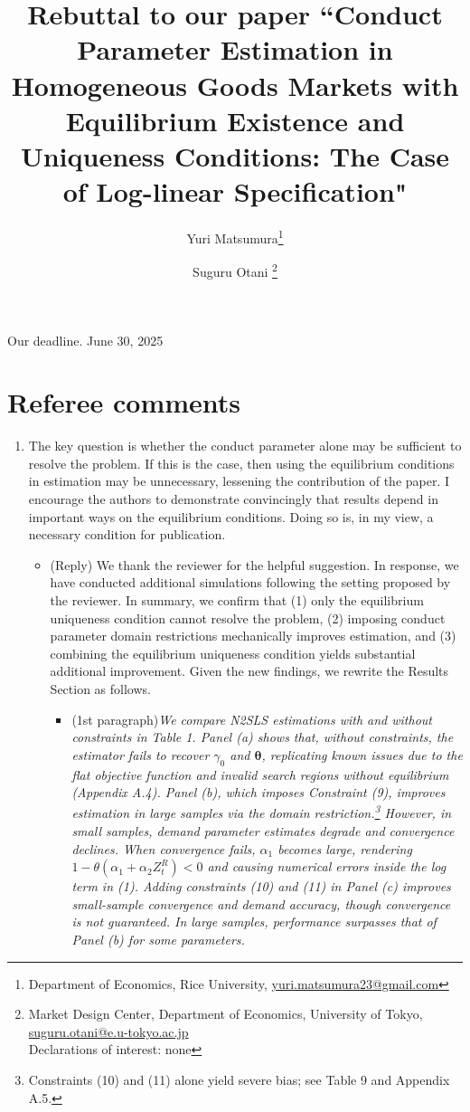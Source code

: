 \documentclass[11pt, a4paper]{article}
\title{Rebuttal to our paper ``Conduct Parameter Estimation in Homogeneous Goods Markets with Equilibrium Existence and Uniqueness Conditions: The Case of Log-linear Specification"}
\author{Yuri Matsumura\thanks{Department of Economics, Rice University, \href{mailto:}{yuri.matsumura23@gmail.com}} \and Suguru Otani \thanks{Market Design Center, Department of Economics, University of Tokyo, \href{mailto:}{suguru.otani@e.u-tokyo.ac.jp}
\\Declarations of interest: none %
}}
\theoremstyle{remark}
\begin{document}
\maketitle

\bigskip

Our deadline. June 30, 2025

\section{Referee comments}
\begin{enumerate}
    \item The key question is whether the conduct parameter alone may be sufficient to resolve the problem. If this is the case, then using the equilibrium conditions in estimation may be unnecessary, lessening the contribution of the paper. I encourage the authors to demonstrate convincingly that results depend in important ways on the equilibrium conditions. Doing so is, in my view, a necessary condition for publication.
    \begin{itemize}
        \item (Reply) We thank the reviewer for the helpful suggestion. In response, we have conducted additional simulations following the setting proposed by the reviewer. In summary, we confirm that (1) only the equilibrium uniqueness condition cannot resolve the problem, (2) imposing conduct parameter domain restrictions mechanically improves estimation, and (3) combining the equilibrium uniqueness condition yields substantial additional improvement. Given the new findings, we rewrite the Results Section as follows.
        \begin{itemize}
            \item (1st paragraph)\textit{We compare N2SLS estimations with and without constraints in Table 1. Panel (a) shows that, without constraints, the estimator fails to recover $\gamma_0$ and $\boldsymbol{\theta}$, replicating known issues due to the flat objective function and invalid search regions without equilibrium (Appendix A.4). Panel (b), which imposes Constraint (9), improves estimation in large samples via the domain restriction.\footnote{Constraints (10) and (11) alone yield severe bias; see Table 9 and Appendix A.5.} However, in small samples, demand parameter estimates degrade and convergence declines. When convergence fails, $\alpha_1$ becomes large, rendering $1-\theta\left(\alpha_1+\alpha_2 Z_t^R\right)<0$ and causing numerical errors inside the log term in (1). Adding constraints (10) and (11) in Panel (c) improves small-sample convergence and demand accuracy, though convergence is not guaranteed. In large samples, performance surpasses that of Panel (b) for some parameters.}

\end{itemize}
\end{itemize}
\end{enumerate}
\end{document}
